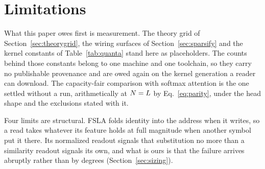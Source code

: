 %
%
%
\section{Limitations}
\label{sec:limitations}

What this paper owes first is measurement. The theory grid of Section~\ref{sec:theorygrid}, the wiring surfaces of Section~\ref{sec:sparsify} and the kernel constants of Table~\ref{tab:quanta} stand here as placeholders. The counts behind those constants belong to one machine and one toolchain, so they carry no publishable provenance and are owed again on the kernel generation a reader can download. The capacity-fair comparison with softmax attention is the one settled without a run, arithmetically at $N = L$ by Eq.~\eqref{eq:parity}, under the head shape and the exclusions stated with it.

Four limits are structural. FSLA folds identity into the address when it writes, so a read takes whatever its feature holds at full magnitude when another symbol put it there. Its normalized readout signals that substitution no more than a similarity readout signals its own, and what is ours is that the failure arrives abruptly rather than by degrees (Section~\ref{sec:sizing}).

